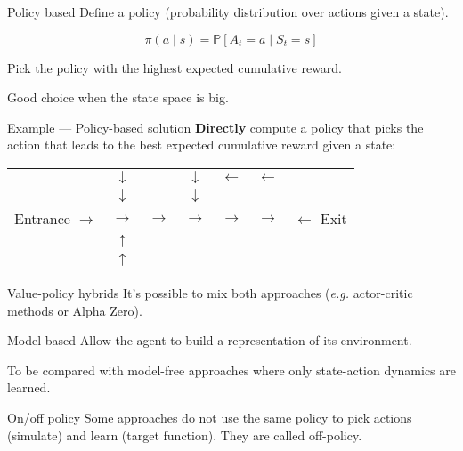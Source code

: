 \begin{frame}{Policy based}
  Define a policy (probability distribution over actions given a state).

  \[
    \pi(a \mid s) = \mathbb{P}[A_t = a \mid S_t = s]
  \]

  Pick the policy with the highest expected cumulative reward.

  Good choice when the state space is big.
\end{frame}

\begin{frame}{Example --- Policy-based solution}
  \textbf{Directly} compute a policy that picks the action that leads to the best expected cumulative reward given a state:

  \begin{tabular}{c|c|c|c|c|c|c}
    \cline{2-6}
      & $\downarrow$ & \cellcolor{black} & $\downarrow$ & $\leftarrow$ & $\leftarrow$ & \\
      \cline{2-6}
      & $\downarrow$ & \cellcolor{black} & $\downarrow$ & \cellcolor{black} & \cellcolor{black} & \\
      \cline{2-6}
      Entrance $\rightarrow$ & $\rightarrow$ & $\rightarrow$ & $\rightarrow$ & $\rightarrow$ & $\rightarrow$ & $\leftarrow$ Exit \\
      \cline{2-6}
      & $\uparrow$ & \cellcolor{black} & \cellcolor{black} & \cellcolor{black} & \cellcolor{black} & \\
      \cline{2-6}
      & $\uparrow$ & \cellcolor{black} & \cellcolor{black} & \cellcolor{black} & \cellcolor{black} & \\
      \cline{2-6}
  \end{tabular}
\end{frame}

\begin{frame}{Value-policy hybrids}
  It's possible to mix both approaches (\textit{e.g.} actor-critic methods or Alpha Zero).
\end{frame}

\begin{frame}{Model based}
  Allow the agent to build a representation of its environment.

  To be compared with model-free approaches where only state-action dynamics are learned.
\end{frame}

\begin{frame}{On/off policy}
  Some approaches do not use the same policy to pick actions (simulate) and learn (target function). They are called off-policy.
\end{frame}


